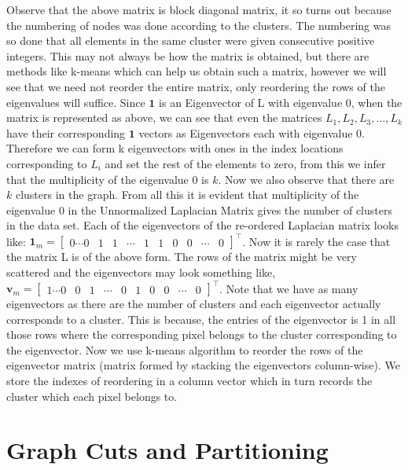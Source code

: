 \documentclass[english]{article}
\theoremstyle{plain}
\begin{document}
Observe that the above matrix is block diagonal matrix, it so turns out because the numbering of nodes was done according to the clusters. The numbering was so done that all elements in the same cluster were given consecutive positive integers. This may not always be how the matrix is obtained, but there are methods like k-means which can help us obtain such a matrix, however we will see that we need not reorder the entire matrix, only reordering the rows of the eigenvalues will suffice. Since $\boldsymbol{1}$ is an Eigenvector of L with eigenvalue 0, when the matrix is represented as above, we can see that even the matrices $L_{1}, L_{2}, L_{3}, ..., L_{k}$ have their corresponding $\boldsymbol{1}$ vectors as Eigenvectors each with eigenvalue 0. Therefore we can form k eigenvectors with ones in the index locations corresponding to $L_{i}$ and set the rest of the elements to zero, from this we infer that the multiplicity of the eigenvalue 0 is $k$. Now we also observe that there are $k$ clusters in the graph. From all this it is evident that multiplicity of the eigenvalue 0 in the Unnormalized Laplacian Matrix gives the number of clusters in the data set.
Each of the eigenvectors of the re-ordered Laplacian matrix looks like:
$
\boldsymbol{1}_{m} = \begin{bmatrix}
0 \cdots 0 & 1 & 1 & \cdots & 1 & 1 & 0 & 0 & \cdots & 0
\end{bmatrix}^{\top}
$.
Now it is rarely the case that the matrix L is of the above form. The rows of the matrix might be very scattered and the eigenvectors may look something like,
$
\boldsymbol{v}_{m} = \begin{bmatrix}
1 \cdots 0 & 0 & 1 & \cdots & 0 & 1 & 0 & 0 & \cdots & 0
\end{bmatrix}^{\top}
$.
Note that we have as many eigenvectors as there are the number of clusters and each eigenvector actually corresponds to a cluster. This is because, the entries of the eigenvector is 1 in all those rows where the corresponding pixel belongs to the cluster corresponding to the eigenvector. Now we use k-means algorithm to reorder the rows of the eigenvector matrix (matrix formed by stacking the eigenvectors column-wise). We store the indexes of reordering in a column vector which in turn records the cluster which each pixel belongs to.

\section{Graph Cuts and Partitioning}
\end{document}
